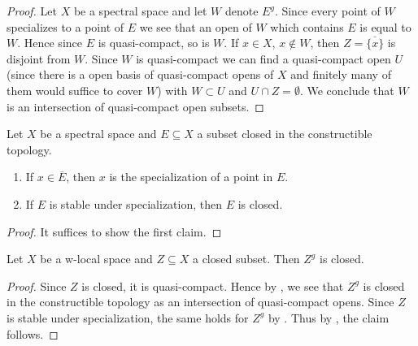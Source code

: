 \begin{proof}
  Let $X$ be a spectral space and let $W$ denote $E^g$. Since every point of $W$ specializes to a point of $E$ we see that an open of $W$ which contains $E$ is equal to $W$. Hence since $E$ is quasi-compact, so is $W$. If $x \in X$, $x \notin W$, then $Z = \overline{\{x\}}$ is disjoint from $W$. Since $W$ is quasi-compact we can find a quasi-compact open $U$ (since there is a open basis of quasi-compact opens of $X$ and finitely many of them would suffice to cover $W$) with $W \subset U$ and $U \cap Z = \emptyset$. We conclude that $W$ is an intersection of quasi-compact open subsets.
\end{proof}

\begin{lemma}[\stacksproject{0903}]
    \label{lemma:spectral-constructible-closed-closed}
    Let $X$ be a spectral space and $E \subseteq X$ a subset closed in the constructible topology.
    \begin{enumerate}
        \item If $x \in \overline{E}$, then $x$ is the specialization of a point in $E$.
        \item If $E$ is stable under specialization, then $E$ is closed. \label{item:specialization-closed-spectral-constructible-closed-closed}
    \end{enumerate}
\end{lemma}

\begin{proof}
    It suffices to show the first claim.
\end{proof}

\begin{lemma}
    Let $X$ be a w-local space and $Z \subseteq X$ a closed subset. Then $Z^g$ is closed.
    \label{lemma:w-local-generalization-closed-closed}
\end{lemma}

\begin{proof}
    Since $Z$ is closed, it is quasi-compact. Hence by ,
    we see that $Z^g$ is closed in the constructible topology as an intersection of quasi-compact opens.
    Since $Z$ is stable under specialization, the same holds for $Z^g$ by
    . Thus
    by , the claim follows.
\end{proof}

